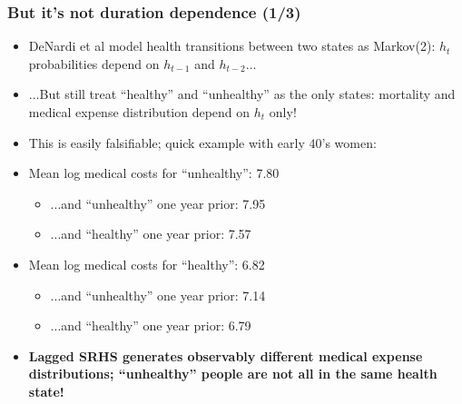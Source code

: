 \documentclass[aspectratio=169]{beamer}
\begin{document}
\begin{frame}\frametitle{But it's not duration dependence (1/3)}
\begin{itemize}
	\item <1->DeNardi et al model health transitions between two states as Markov(2): $h_{t}$ probabilities depend on $h_{t-1}$ and $h_{t-2}$...
	
	\item <2->...But still treat ``healthy'' and ``unhealthy'' as the only states: mortality and medical expense distribution depend on $h_t$ only!
	
	\item <3->This is easily falsifiable; quick example with early 40's women:
	
	\item <3->Mean log medical costs for ``unhealthy'': 7.80
	\begin{itemize}
		\item <4->...and ``unhealthy'' one year prior: 7.95
		
		\item <4->...and ``healthy'' one year prior: 7.57
	\end{itemize}

	\item <3->Mean log medical costs for ``healthy'': 6.82
	\begin{itemize}
		\item <5->...and ``unhealthy'' one year prior: 7.14
		
		\item <5->...and ``healthy'' one year prior: 6.79
	\end{itemize}
	
	\item <6->\textbf{Lagged SRHS generates observably different medical expense distributions; ``unhealthy'' people are not all in the same health state!}
\end{itemize}
\end{frame}
\end{document}

